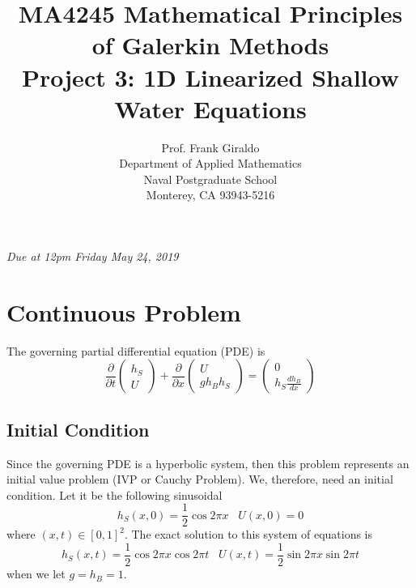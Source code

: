 \documentclass[10pt]{article}
\newcommand{\diff}[2] {\frac{\partial #1}{\partial #2}}
\newcommand{\difft}[2] {\frac{d #1}{d #2}}
\begin{document}
\title{MA4245 Mathematical Principles of Galerkin Methods \\
Project 3: 1D Linearized Shallow Water Equations}
\author{Prof. Frank Giraldo \\
Department of Applied Mathematics \\
Naval Postgraduate School \\
Monterey, CA 93943-5216}

\maketitle

\emph{Due at 12pm Friday May 24, 2019}

\section{Continuous Problem}
The governing partial differential equation (PDE) is
\begin{equation}
\diff{}{t}
\left(
\begin{array}{c}
h_S \\
U
\end{array}
\right)
+
\diff{}{x}
\left(
\begin{array}{c}
U \\
g h_B h_S 
\end{array}
\right)
=
\left(
\begin{array}{c}
0 \\
h_S \difft{h_B}{x}
\end{array}
\right)
\label{eq:1d_cgdg/1d_linearized_swe}
\end{equation}

\subsection{Initial Condition}
Since the governing PDE is a hyperbolic system, then this problem represents an initial value problem (IVP or Cauchy Problem).  We, therefore, need 
an initial condition. 
Let it be the following sinusoidal
\begin{equation}
h_S(x,0)=\frac{1}{2} \cos 2 \pi x \; 
\;  \;
U(x,0)=0
\label{eq:1d_cgdg/initial_condition}
\end{equation}
where $(x,t) \in [0,1]^2$. The exact solution to this system of equations is 
\begin{equation}
h_S(x,t)=\frac{1}{2} \cos 2 \pi x \cos 2 \pi t \; \; \;
U(x,t)=\frac{1}{2} \sin 2 \pi x \sin 2 \pi t
\label{eq:1d_cgdg/analytic_solution}
\end{equation}
when we let $g=h_B=1$.
\end{document}

